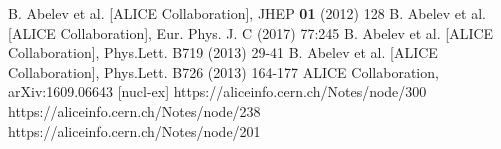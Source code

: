 \begin{thebibliography}{99}
 B. Abelev et al. [ALICE Collaboration], JHEP {\bf 01} (2012) 128
 B. Abelev et al. [ALICE Collaboration], Eur. Phys. J. C (2017) 77:245
 B. Abelev et al. [ALICE Collaboration], Phys.Lett. B719 (2013) 29-41
 B. Abelev et al. [ALICE Collaboration], Phys.Lett. B726 (2013) 164-177
 ALICE Collaboration, arXiv:1609.06643 [nucl-ex]
 https://aliceinfo.cern.ch/Notes/node/300
 https://aliceinfo.cern.ch/Notes/node/238
 https://aliceinfo.cern.ch/Notes/node/201
\end{thebibliography} 